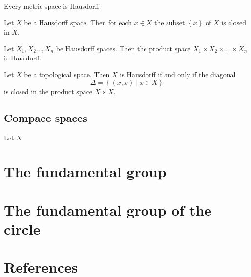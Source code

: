 \documentclass{article}
\theoremstyle{remark}
\begin{document}
\begin{theorem}
    Every metric space is Hausdorff

\end{theorem}

\begin{theorem}
    Let $X$ be a Hausdorff space. Then for each $x \in X$ the subset $\left\{ x  \right\}$ of $X$ is closed in  $X$.
\end{theorem}


\begin{theorem}
    Let $X_{1}, X_{2} \ldots, X_{n} $ be Hausdorff spaces.  Then the product space $X_{1} \times  X_{2}\times  \ldots
    \times X_{n}  $ is Hausdorff.

\end{theorem}


\begin{theorem}
Let $X$ be a topological space.  Then $X$ is Hausdorff if and only if the diagonal \[
    \Delta = \left\{ \left( x,x \right)  \mid  x \in  X \right\}
\]is closed in the product space $X \times  X$.
\end{theorem}

\subsection{Compace spaces}%
\label{sub:compace_spaces}

\begin{definition}
    Let $X$

\end{definition}



\section{ The fundamental group}%
\label{sec:the_fundamental_group}


\section{ The fundamental group of the circle}%
\label{sec:the_fundamental_group_of_the_circle}




\newpage
\section{References}%
\label{sec:references}



\end{document}
